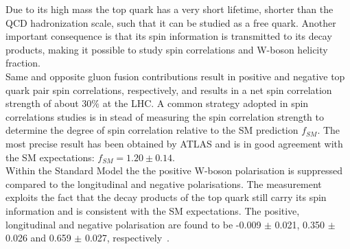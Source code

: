Due to its high mass the top quark has a very short lifetime, shorter than the QCD hadronization scale, such that it can be studied as a free quark. Another important consequence is that its spin information is transmitted to its decay products, making it possible to study spin correlations and W-boson helicity fraction.
\\
Same and opposite gluon fusion contributions result in positive and negative top quark pair spin correlations, respectively, and results in a net spin correlation strength of about $30 \%$ at the LHC.
A common strategy adopted in spin correlations studies is in stead of measuring the spin correlation strength to determine the degree of spin correlation relative to the SM prediction $f_{SM}$. 
The most precise result has been obtained by ATLAS and is in good agreement with the SM expectations: $f_{SM} = 1.20 \pm 0.14$.
\\
Within the Standard Model the the positive W-boson polarisation is suppressed compared to the longitudinal and negative polarisations. 
The measurement exploits the fact that the decay products of the top quark still carry its spin information and is consistent with the SM expectations.
The positive, longitudinal and negative polarisation are found to be -0.009 $\pm$ 0.021, 0.350 $\pm$ 0.026 and 0.659 $\pm$ 0.027, respectively~\cite{CMSWHelicity}.

